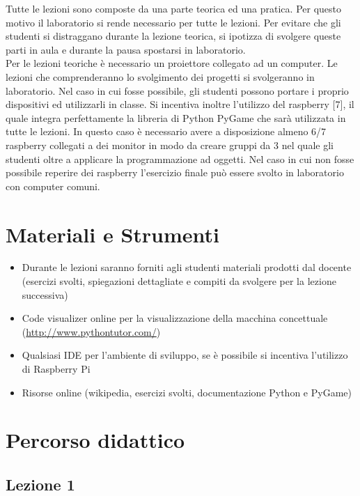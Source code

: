 \documentclass[12pt,a4paper]{article}
\begin{document}
Tutte le lezioni sono composte da una parte teorica ed una pratica. Per questo motivo il laboratorio si rende necessario per tutte le lezioni. Per evitare che gli studenti si distraggano durante la lezione teorica, si ipotizza di svolgere queste parti in aula e durante la pausa spostarsi in laboratorio.\\
Per le lezioni teoriche è necessario un proiettore collegato ad un computer. Le lezioni che comprenderanno lo svolgimento dei progetti si svolgeranno in laboratorio. Nel caso in cui fosse possibile, gli studenti possono portare i proprio dispositivi ed utilizzarli in classe. Si incentiva inoltre l’utilizzo del raspberry [7], il quale integra perfettamente la libreria di Python PyGame che sarà utilizzata in tutte le lezioni. In questo caso è necessario avere a disposizione almeno 6/7 raspberry collegati a dei monitor in modo da creare gruppi da 3 nel quale gli studenti oltre a applicare la programmazione ad oggetti. Nel caso in cui non fosse possibile reperire dei raspberry l’esercizio finale può essere svolto in laboratorio con computer comuni.



\section{Materiali e Strumenti}\label{materiali}

\begin{itemize}
     \item Durante le lezioni saranno forniti agli studenti materiali prodotti dal docente (esercizi svolti, spiegazioni dettagliate e compiti da svolgere per la lezione successiva)
     \item Code visualizer online per la visualizzazione della macchina concettuale (\url{http://www.pythontutor.com/})
     \item Qualsiasi IDE per l’ambiente di sviluppo, se è possibile si incentiva l’utilizzo di Raspberry Pi
     \item Risorse online (wikipedia, esercizi svolti, documentazione Python e PyGame)
   \end{itemize}


\section{Percorso didattico}\label{percorso-didattico}



\subsection{Lezione 1} 
\end{document}

